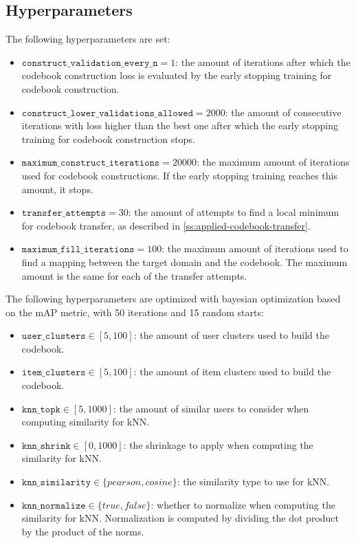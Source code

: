 \subsection{Hyperparameters}

The following hyperparameters are set:
\begin{itemize}
\item $\texttt{construct\_validation\_every\_n} = 1$: the amount of iterations after which the codebook construction loss is evaluated by the early stopping training for codebook construction.
\item $\texttt{construct\_lower\_validations\_allowed} = 2000$: the amount of consecutive iterations with loss higher than the best one after which the early stopping training for codebook construction stops.
\item $\texttt{maximum\_construct\_iterations} = 20000$: the maximum amount of iterations used for codebook constructions. If the early stopping training reaches this amount, it stops.
\item $\texttt{transfer\_attempts} = 30$: the amount of attempts to find a local minimum for codebook transfer, as described in \autoref{ss:applied-codebook-transfer}.
\item $\texttt{maximum\_fill\_iterations} = 100$: the maximum amount of iterations used to find a mapping between the target domain and the codebook. The maximum amount is the same for each of the transfer attempts.
\end{itemize}
The following hyperparameters are optimized with bayesian optimization based on the mAP metric, with 50 iterations and 15 random starts:
\begin{itemize}
\item $\texttt{user\_clusters} \in [5,100]$: the amount of user clusters used to build the codebook.
\item $\texttt{item\_clusters} \in [5,100]$: the amount of item clusters used to build the codebook.
\item $\texttt{knn\_topk} \in [5,1000]$: the amount of similar users to consider when computing similarity for kNN.
\item $\texttt{knn\_shrink} \in [0,1000]$: the shrinkage to apply when computing the similarity for kNN.
\item $\texttt{knn\_similarity} \in \{pearson,cosine\}$: the similarity type to use for kNN.
\item $\texttt{knn\_normalize} \in \{true,false\}$: whether to normalize when computing the similarity for kNN. Normalization is computed by dividing the dot product by the product of the norms.
\end{itemize}


